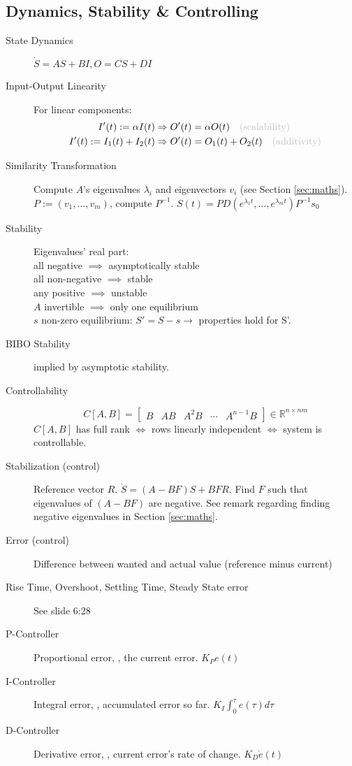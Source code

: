 \subsection{Dynamics, Stability \& Controlling}
\begin{description}
	\item[State Dynamics] $\dot{S} = AS + BI, O = CS + DI$
	\item[Input-Output Linearity] For linear components: \\
	\begin{align*}
	I'(t) := \alpha I(t) &\Rightarrow O'(t) = \alpha O(t) \NOTE{(scalability)}\\
	I'(t) := I_1(t) + I_2(t) &\Rightarrow O'(t) = O_1(t) + O_2(t) \NOTE{(additivity)}
	\end{align*}
	\item[Similarity Transformation] Compute $A$'s eigenvalues $\lambda_i$ and
	eigenvectors $v_i$ (see Section \ref{sec:maths}).\nl
	$P := (v_1,\ldots, v_m)$, compute $P^{-1}$. \nl
	$S(t) = PD(e^{\lambda_1t}, \ldots, e^{\lambda_mt})P^{-1} s_0$
	\item[Stability] Eigenvalues' real part:\\
    all negative $\implies$ asymptotically stable\\ 
	all non-negative $\implies$ stable\\
    any positive $\implies$ unstable\\
	$A$ invertible $\implies$ only one equilibrium\\
	$s$ non-zero equilibrium: $S' = S - s \rightarrow$ properties hold for S'. 
	\item[BIBO Stability] implied by asymptotic stability.
	\item[Controllability] \[C[A,B] = \left[ \begin{array}{ccccc}
    B & AB & A^{2}B & \cdots & A^{n-1}B \end{array} \right] \in \mathbb{R}^{n \times nm}\]
    $C[A,B]$ has full rank $\iff$ rows linearly independent $\iff$ system is controllable.
	\item[Stabilization (control)] Reference vector $R$. $\dot{S} = (A - BF)S + BFR$. Find
	$F$ such that eigenvalues of $(A - BF)$ are negative. See remark regarding
	finding negative eigenvalues in Section \ref{sec:maths}.
	\item[Error (control)] Difference between wanted and actual value (reference minus current)
	\item[Rise Time, Overshoot, Settling Time, Steady State error] See slide 6:28
	\item[P-Controller] Proportional error, \ie, the current error. $K_P e(t)$
	\item[I-Controller] Integral error, \ie, accumulated error so far. $K_I
	\int_0^\tau e(\tau) d\tau$
	\item[D-Controller] Derivative error, \ie, current error's rate of change.
	$K_D \dot{e}(t)$
\end{description}
